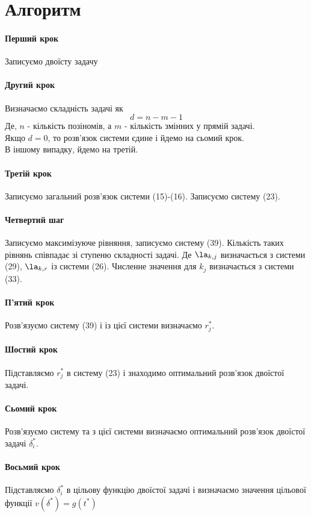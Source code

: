 \section{Алгоритм}
\paragraph{Перший крок} Записуємо двоїсту задачу
\paragraph{Другий крок} Визначаємо складність задачі як 
\begin{equation}
d= n-m-1
\end{equation}
Де, $n$ - кількість позіномів, а $m$ - кількість змінних у прямій задачі.\\
Якщо $d=0$, то розв’язок системи єдине і йдемо на сьомий крок. \\
В іншому випадку, йдемо на третій.
\paragraph{Третій крок}
Записуємо загальний розв’язок системи (15)-(16). Записуємо систему (23). 
\paragraph{Четвертий шаг} 
Записуємо максимізуюче рівняння, записуємо систему (39). Кількість таких рівнянь співпадає зі ступеню складності задачі. Де $\la_{k,j}$ визначається з системи (29), $\la_{k,r}$ із системи (26). Численне значення для $k_j$ визначається з системи (33). 
\paragraph{П’ятий крок}
Розв’язуємо систему (39) і із цієї системи визначаємо $r_j^*$.
\paragraph{Шостий крок}
Підставляємо $r_j^*$ в систему (23) і знаходимо оптимальний розв’язок двоїстої задачі.
\paragraph{Сьомий крок}
Розв’язуємо систему та з цієї системи визначаємо оптимальний розв’язок двоїстої задачі $\delta_i^\ast$.
\paragraph{Восьмий крок}
Підставляємо $\delta_i^\ast$ в цільову функцію двоїстої задачі і визначаємо значення цільової функції $v(\delta^\ast) = g(t^\ast)$
